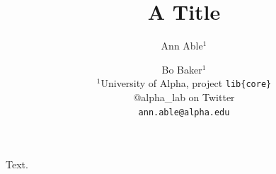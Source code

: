 \documentclass{article}
\title{A Title}
\author{%
  Ann Able$^{1}$ \and
  Bo Baker$^{1}$ \\
 {\normalfont $^1$University of Alpha, project \texttt{lib\{core\}}} \\
 {\normalfont @alpha\_lab on Twitter} \\
 \texttt{ann.able@alpha.edu}
}
\begin{document}
\maketitle
Text.
\end{document}
